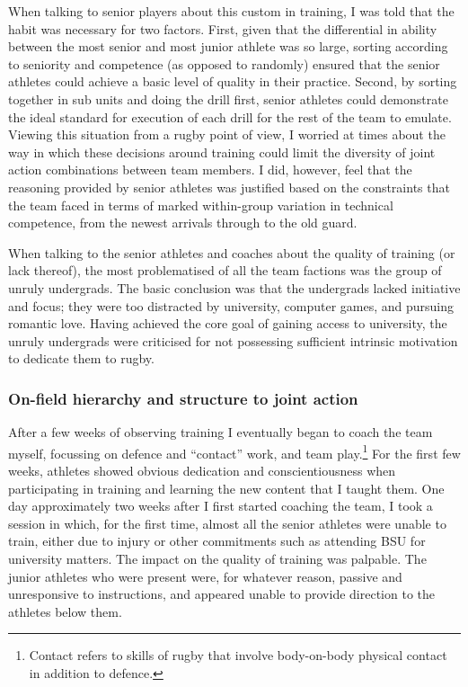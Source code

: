 \begin{CJK}{UTF8}{gbsn}
When talking to senior players about this custom in training, I was told that the habit was necessary for two factors. First, given that the differential in ability between the most senior and most junior athlete was so large, sorting according to seniority and competence (as opposed to randomly) ensured that the senior athletes could achieve a basic level of quality in their practice.  Second, by sorting together in sub units and doing the drill first, senior athletes could demonstrate the ideal standard for execution of each drill for the rest of the team to emulate.  Viewing this situation from a rugby point of view, I worried at times about the way in which these decisions around training could limit the diversity of joint action combinations between team members. I did, however, feel that the reasoning provided by senior athletes was justified based on the constraints that the team faced in terms of marked within-group variation in technical competence, from the newest arrivals through to the old guard.

When talking to the senior athletes and coaches about the quality of training (or lack thereof), the most problematised of all the team factions was the group of unruly undergrads.  The basic conclusion was that the undergrads lacked initiative and focus; they were too distracted by university, computer games, and pursuing romantic love. Having achieved the core goal of gaining access to university, the unruly undergrads were criticised for not possessing sufficient intrinsic motivation to dedicate them to rugby.

\subsubsection{On-field hierarchy and structure to joint action}
After a few weeks of observing training I eventually began to coach the team myself, focussing on defence and ``contact'' work, and team play.\footnote{Contact refers to skills of rugby that involve body-on-body physical contact in addition to defence.}  For the first few weeks, athletes showed obvious dedication and conscientiousness when participating in training and learning the new content that I taught them.  One day approximately two weeks after I first started coaching the team,  I took a session in which, for the first time, almost all the senior athletes were unable to train, either due to injury or other commitments such as attending BSU for university matters.  The impact on the quality of training was palpable.  The junior athletes who were present were, for whatever reason, passive and unresponsive to instructions, and appeared unable to provide direction to the athletes below them.


\end{CJK}
